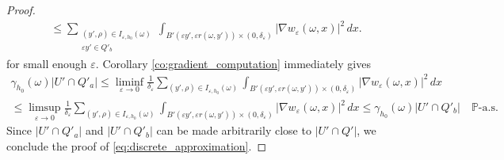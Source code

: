 \documentclass{article}
\numberwithin{equation}{section}
\theoremstyle{definition}
\theoremstyle{remark}
\begin{document}
\begin{proof}
\begin{multline*}
        \le \sum \limits_{\substack{(y', \rho) \in I_{\varepsilon, h_0}(\omega) \\ \varepsilon y' \in Q'_b}} \int_{B'(\varepsilon y', \varepsilon r(\omega, y')) \times (0, \delta_\varepsilon)} |\nabla w_\varepsilon(\omega, x)|^2 \, dx.
    \end{multline*}
    for small enough $\varepsilon$. Corollary \ref{co:gradient_computation} immediately gives
    \begin{multline*}
        \gamma_{h_0}(\omega) |U' \cap Q'_a| \le \liminf_{\varepsilon \to 0} \frac{1}{\delta_\varepsilon} \sum_{(y', \rho) \in I_{\varepsilon, h_0}(\omega)} \int_{B'(\varepsilon y', \varepsilon r(\omega, y')) \times (0, \delta_\varepsilon)} |\nabla w_\varepsilon(\omega, x)|^2 \, dx\\
        \le \limsup_{\varepsilon \to 0} \frac{1}{\delta_\varepsilon} \sum_{(y', \rho) \in I_{\varepsilon, h_0}(\omega)} \int_{B'(\varepsilon y', \varepsilon r(\omega, y')) \times (0, \delta_\varepsilon)} |\nabla w_\varepsilon(\omega, x)|^2 \, dx \le \gamma_{h_0}(\omega) |U' \cap Q'_b| \quad \mathbb{P}\text{-a.s.}
    \end{multline*}
    Since $|U' \cap Q'_a|$ and $|U' \cap Q'_b|$ can be made arbitrarily close to $|U' \cap Q'|$, we conclude the proof of \eqref{eq:discrete_approximation}.


\end{proof}
\end{document}
